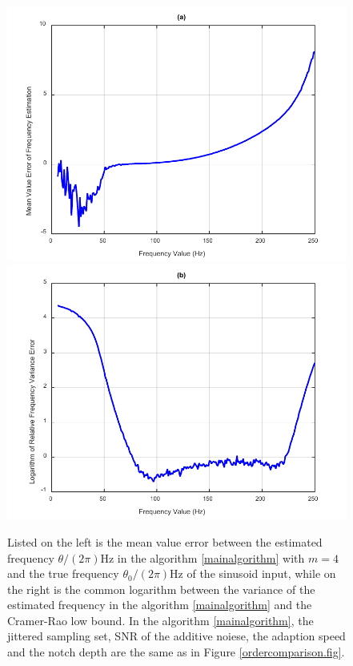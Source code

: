\documentclass{UCF_ETD}
\begin{document}
\begin{figure}[H]
\begin{center}
\includegraphics[scale=0.8]{NonuniformANF/CLRB_meanvalue}
\includegraphics[scale=0.8]{NonuniformANF/CLRB_varianceerror}
\caption{Listed on the left is the mean value error  between the estimated frequency  $ \theta/(2\pi)$Hz
in the algorithm \eqref{mainalgorithm} with $m=4$ and the true frequency $\theta_0/(2\pi)$Hz of the sinusoid input, while on the right
is the common logarithm  between the variance of the estimated frequency
in the algorithm \eqref{mainalgorithm} and the Cramer-Rao low bound.
In the algorithm \eqref{mainalgorithm},
the jittered sampling  set, SNR of the additive noiese,
the adaption speed  and  the notch depth are the same as in Figure
 \ref{ordercomparison.fig}.
}
\label{clrb_meanvariance.fig}
\end{center}
\end{figure}
\end{document}
